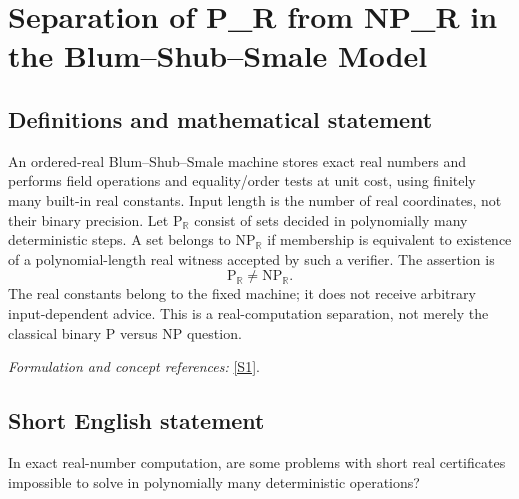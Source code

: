 \documentclass[11pt,a4paper]{article}
\newcommand{\R}{\mathbb{R}}
\newcommand{\sref}[2]{\hyperlink{source:#1:#2}{[S#2]}}
\newif\ifshowcatalogue
\newcommand{\cataloguescope}[1]{\ifshowcatalogue
 \paragraph{Exact scope in the supplied catalogue.}
 \begin{quote}\small #1\end{quote}\fi}
\numberwithin{equation}{section}
\begin{document}
\setcounter{section}{171}
\clearpage
\section{\texorpdfstring{Separation of P\_R from NP\_R in the Blum–Shub–Smale Model}{Separation of P\_R from NP\_R in the Blum–Shub–Smale Model}}\label{172}
\subsection{Definitions and mathematical statement}
An ordered-real Blum--Shub--Smale machine stores exact real numbers and performs field operations and equality/order tests at unit cost, using finitely many built-in real constants. Input length is the number of real coordinates, not their binary precision. Let $\mathrm P_{\R}$ consist of sets decided in polynomially many deterministic steps. A set belongs to $\mathrm{NP}_{\R}$ if membership is equivalent to existence of a polynomial-length real witness accepted by such a verifier. The assertion is
\[
 \mathrm P_{\R}\ne\mathrm{NP}_{\R}.
\]
The real constants belong to the fixed machine; it does not receive arbitrary input-dependent advice. This is a real-computation separation, not merely the classical binary $\mathrm P$ versus $\mathrm{NP}$ question.
\par\smallskip\textit{Formulation and concept references:} \sref{172}{1}.
\cataloguescope{In the standard ordered-real Blum–Shub–Smale model, machines use finitely many built-in real constants, real-valued registers, exact field operations (+,-,multiplication,division where defined) and order/equality tests at unit cost. Inputs are finite real vectors and size is vector length. Let P\_R be decision problems solved by deterministic machines in polynomially many steps, and NP\_R those with polynomial-length real witnesses verifiable in P\_R. The assertion is P\_R != NP\_R.}
\subsection{Short English statement}
In exact real-number computation, are some problems with short real certificates impossible to solve in polynomially many deterministic operations?
\end{document}
